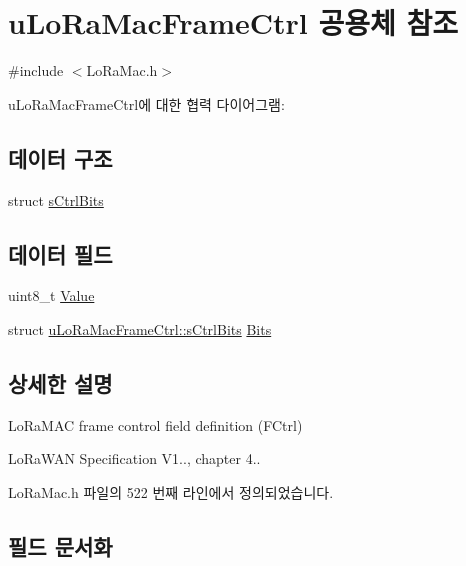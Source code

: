 \hypertarget{unionu_lo_ra_mac_frame_ctrl}{}\section{u\+Lo\+Ra\+Mac\+Frame\+Ctrl 공용체 참조}
\label{unionu_lo_ra_mac_frame_ctrl}


{\ttfamily \#include $<$Lo\+Ra\+Mac.\+h$>$}



u\+Lo\+Ra\+Mac\+Frame\+Ctrl에 대한 협력 다이어그램\+:
\subsection*{데이터 구조}
\begin{DoxyCompactItemize}
\item 
struct \mbox{\hyperlink{structu_lo_ra_mac_frame_ctrl_1_1s_ctrl_bits}{s\+Ctrl\+Bits}}
\end{DoxyCompactItemize}
\subsection*{데이터 필드}
\begin{DoxyCompactItemize}
\item 
uint8\+\_\+t \mbox{\hyperlink{unionu_lo_ra_mac_frame_ctrl_a88f4d00bdab99ae6f48c7ae0bc468bb4}{Value}}
\item 
struct \mbox{\hyperlink{structu_lo_ra_mac_frame_ctrl_1_1s_ctrl_bits}{u\+Lo\+Ra\+Mac\+Frame\+Ctrl\+::s\+Ctrl\+Bits}} \mbox{\hyperlink{unionu_lo_ra_mac_frame_ctrl_ade2054f4acef310e1e17b10aaca43a6f}{Bits}}
\end{DoxyCompactItemize}


\subsection{상세한 설명}
Lo\+Ra\+M\+AC frame control field definition (F\+Ctrl)

Lo\+Ra\+W\+AN Specification V1.., chapter 4.. 

Lo\+Ra\+Mac.\+h 파일의 522 번째 라인에서 정의되었습니다.



\subsection{필드 문서화}
\mbox{\label{unionu_lo_ra_mac_frame_ctrl_ade2054f4acef310e1e17b10aaca43a6f}} 
